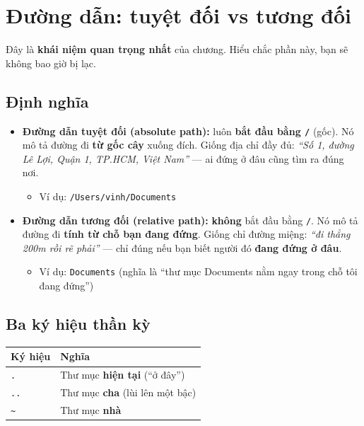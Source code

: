 \documentclass[12pt,a4paper]{article}
\newcommand{\hm}{\textasciitilde{}}
\begin{document}
\section{Đường dẫn: tuyệt đối vs tương đối}

Đây là \textbf{khái niệm quan trọng nhất} của chương. Hiểu chắc phần này, bạn sẽ không bao giờ bị lạc.

\subsection{Định nghĩa}

\begin{itemize}[leftmargin=*]
  \item \textbf{Đường dẫn tuyệt đối (absolute path):} luôn \textbf{bắt đầu bằng \texttt{/}} (gốc). Nó mô tả đường đi \textbf{từ gốc cây} xuống đích. Giống địa chỉ đầy đủ: \textit{``Số 1, đường Lê Lợi, Quận 1, TP.HCM, Việt Nam''} --- ai đứng ở đâu cũng tìm ra đúng nơi.
  \begin{itemize}
    \item Ví dụ: \texttt{/Users/vinh/Documents}
  \end{itemize}
  \item \textbf{Đường dẫn tương đối (relative path):} \textbf{không} bắt đầu bằng \texttt{/}. Nó mô tả đường đi \textbf{tính từ chỗ bạn đang đứng}. Giống chỉ đường miệng: \textit{``đi thẳng 200m rồi rẽ phải''} --- chỉ đúng nếu bạn biết người đó \textbf{đang đứng ở đâu}.
  \begin{itemize}
    \item Ví dụ: \texttt{Documents} (nghĩa là ``thư mục Documents nằm ngay trong chỗ tôi đang đứng'')
  \end{itemize}
\end{itemize}

\subsection{Ba ký hiệu thần kỳ}

\renewcommand{\arraystretch}{1.4}
\begin{longtable}{>{\raggedright\arraybackslash}p{2.5cm} >{\raggedright\arraybackslash}p{10cm}}
\rowcolor{checkback}
\textbf{Ký hiệu} & \textbf{Nghĩa} \\
\hline
\endhead
\texttt{.} & Thư mục \textbf{hiện tại} (``ở đây'') \\
\texttt{..} & Thư mục \textbf{cha} (lùi lên một bậc) \\
\texttt{\hm} & Thư mục \textbf{nhà} \\
\end{longtable}
\renewcommand{\arraystretch}{1}
\end{document}
